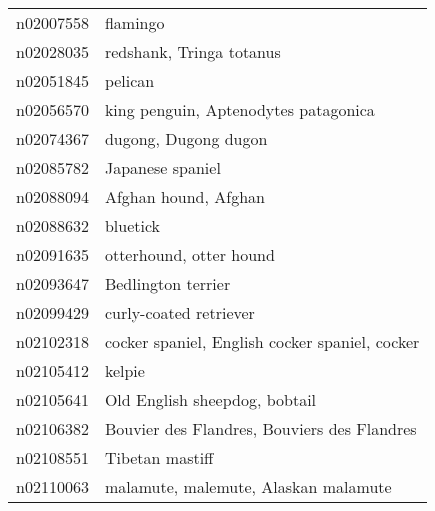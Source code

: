 \begin{appendices}
{\begin{footnotesize}
\begin{longtabu}{X|X[4]}
    		n02007558 &                                                                                                                   flamingo \tabularnewline
    		n02028035 &                                                                                                   redshank, Tringa totanus \tabularnewline
    		n02051845 &                                                                                                                    pelican \tabularnewline
    		n02056570 &                                                                                       king penguin, Aptenodytes patagonica \tabularnewline
    		n02074367 &                                                                                                       dugong, Dugong dugon \tabularnewline
    		n02085782 &                                                                                                           Japanese spaniel \tabularnewline
    		n02088094 &                                                                                                       Afghan hound, Afghan \tabularnewline
    		n02088632 &                                                                                                                   bluetick \tabularnewline
    		n02091635 &                                                                                                    otterhound, otter hound \tabularnewline
    		n02093647 &                                                                                                         Bedlington terrier \tabularnewline
    		n02099429 &                                                                                                     curly-coated retriever \tabularnewline
    		n02102318 &                                                                             cocker spaniel, English cocker spaniel, cocker \tabularnewline
    		n02105412 &                                                                                                                     kelpie \tabularnewline
    		n02105641 &                                                                                              Old English sheepdog, bobtail \tabularnewline
    		n02106382 &                                                                                Bouvier des Flandres, Bouviers des Flandres \tabularnewline
    		n02108551 &                                                                                                            Tibetan mastiff \tabularnewline
    		n02110063 &                                                                                       malamute, malemute, Alaskan malamute \tabularnewline

\end{longtabu}
\end{footnotesize}}
\end{appendices}
